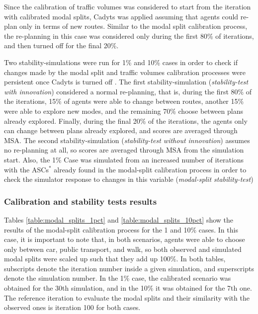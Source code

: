 \documentclass[Journal,letterpaper]{ascelike-new}
\begin{document}
Since the calibration of traffic volumes was considered to start from the iteration with calibrated modal splits, Cadyts was applied assuming that agents could re-plan only in terms of new routes. Similar to the modal split calibration process, the re-planning in this case was considered only during the first 80\% of iterations, and then turned off for the final 20\%.

Two stability-simulations were run for 1\% and 10\% cases in order to check if changes made by the modal split and traffic volumes calibration processes were persistent once Cadyts is turned off . The first stability-simulation (\emph{stability-test with innovation}) considered a normal re-planning, that is, during the first 80\% of the iterations, 15\% of agents were able to change between routes, another 15\% were able to explore new modes, and the remaining 70\% choose between plans already explored. Finally, during the final 20\% of the iterations, the agents only can change between plans already explored, and scores are averaged through MSA. The second stability-simulation (\emph{stability-test without innovation}) assumes no re-planning at all, so scores are averaged through MSA from the simulation start. Also, the 1\% Case was simulated from an increased number of iterations with the ASCs$^{*}$ already found in the modal-split calibration process in order to check the simulator response to changes in this variable (\emph{modal-split stability-test})

\subsubsection{Calibration and stability tests results}
Tables \ref{table:modal_splits_1pct} and \ref{table:modal_splits_10pct} show the results of the modal-split calibration process for the 1 and 10\% cases. In this case, it is important to note that, in both scenarios, agents were able to choose only between car, public transport, and walk, so both observed and simulated modal splits were scaled up such that they add up 100\%. In both tables, subscripts denote the iteration number inside a given simulation, and superscripts denote the simulation number. In the 1\% case, the calibrated scenario was obtained for the 30th simulation, and in the 10\% it was obtained for the 7th one. The reference iteration to evaluate the modal splits and their similarity with the observed ones is iteration 100 for both cases.
\end{document}
